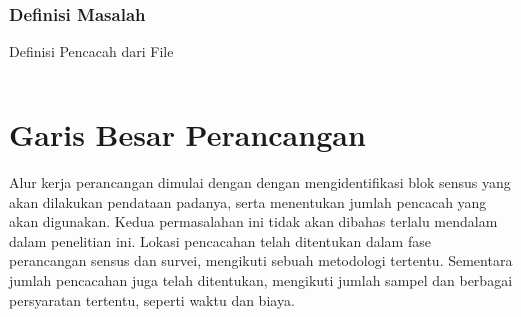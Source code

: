 \subsubsection{Definisi Masalah}

\begin{listing}
    \caption{Definisi Pencacah dari File}
    \label{lst:jsprit_define_enumerators}
	\inputminted[showspaces=false, breaklines=true]{java}{../../Resources/Snippets/jsprit_enumerator.java}    
    
%
%
%
%
%
%
\end{listing}


\section{Garis Besar Perancangan}

Alur kerja perancangan dimulai dengan dengan mengidentifikasi blok sensus yang akan dilakukan pendataan padanya, serta menentukan jumlah pencacah yang akan digunakan. Kedua permasalahan ini tidak akan dibahas terlalu mendalam dalam penelitian ini. Lokasi pencacahan telah ditentukan dalam fase perancangan sensus dan survei, mengikuti sebuah metodologi tertentu. Sementara jumlah pencacahan juga telah ditentukan, mengikuti jumlah sampel dan berbagai persyaratan tertentu, seperti waktu dan biaya.


